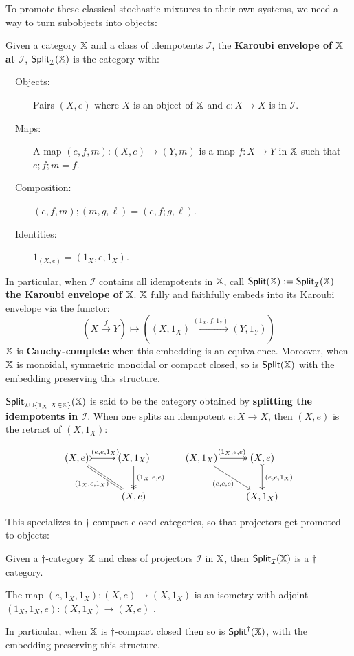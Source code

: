 To promote these classical stochastic mixtures to their own systems, we need a way to turn subobjects into objects:

\begin{definition}
Given a category $\mathbb{X}$ and a class of idempotents $\mathcal I$, the {\bf Karoubi envelope of $\mathbb{X}$ at $\mathcal{I}$}, ${\sf Split}_{\mathcal I}(\mathbb{X})$ is the category with:
\begin{description}
\item[\ \ Objects:] Pairs $(X,e)$ where $X$ is an object of $\mathbb{X}$ and $e:X\to X$ is in $\mathcal I$.
\item[\ \ Maps:] A map $(e,f,m):(X,e)\to (Y,m)$ is a map $f:X\to Y$ in $\mathbb{X}$ such that $e;f;m=f$.
\item[\ \ Composition:] $(e,f,m);(m,g,\ell) = (e,f;g,\ell)$.
\item[\ \ Identities:] $1_{(X,e)}=(1_X,e,1_X)$.
\end{description}


In particular, when $\mathcal{I}$ contains all idempotents in $\mathbb{X}$, call  ${\sf Split}(\mathbb{X}):={\sf Split}_{\mathcal I}(\mathbb{X})$ {\bf the Karoubi envelope of $\mathbb{X}$}.
$\mathbb{X}$ fully and faithfully embeds into its Karoubi envelope via the functor:
$$
\left(X\xrightarrow{f}Y\right)
\mapsto 
\left((X,1_X)\xrightarrow{(1_X,f,1_Y)}(Y,1_Y)\right)
$$
$\mathbb{X}$ is {\bf Cauchy-complete} when this embedding is an equivalence. 
Moreover, when $\mathbb{X}$ is monoidal, symmetric monoidal or compact closed, so is ${\sf Split}(\mathbb{X})$ with the embedding preserving this structure.


${\sf Split}_{{\mathcal I }\cup \{ 1_X | X \in \mathbb{X}\}}(\mathbb{X})$ is said to be the category obtained by {\bf splitting the idempotents in $\mathcal I$}.
When one splits an idempotent $e:X\to X$, then $(X,e)$ is the retract of $(X, 1_X)$:

$$
\xymatrix{
(X,e) \ar@{>->}[r]^{(e,e,1_X)} \ar@{=}[dr]_{(1_X,e,1_X)} & (X,1_X)  \ar@{->>}[d]^{(1_X,e,e)}\\
& (X,e)
}\, \hspace*{.5cm}
\xymatrix{
(X,1_X) \ar@{->>}[r]^{(1_X,e,e)} \ar[dr]_{(e,e,e)} & (X,e)  \ar@{>->}[d]^{(e,e,1_X)}\\
& (X,1_X)
}
$$
\end{definition}

This specializes to $\dag$-compact closed categories, so that projectors get promoted to objects:

\begin{definition}
Given a $\dag$-category $\mathbb{X}$ and class of projectors $\mathcal I$ in $\mathbb{X}$, then  ${\sf Split}_{\mathcal I}(\mathbb{X})$ is a $\dag$ category.

The map $(e,1_X, 1_X) :(X,e)\to (X,1_X)$ is an isometry with adjoint $(1_X,1_X, e) :(X,1_X)\to (X,e)$ .

In particular, when $\mathbb{X}$ is $\dag$-compact closed then so is ${\sf Split}^\dag(\mathbb{X})$, with the embedding preserving this structure.
\end{definition}

